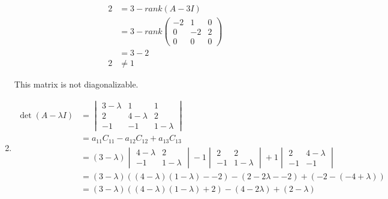\documentclass[13pt]{article}
\begin{document}
\begin{enumerate}[label=(\alph*),leftmargin=*]
\begin{enumerate}
\begin{align*}
      2 &= 3 - rank(A - 3I) \\
                   &= 3 - rank
                     \begin{pmatrix}
                       -2 & 1 & 0 \\
                       0 & -2 & 2 \\
                       0 & 0 & 0
                     \end{pmatrix} \\
                   &= 3 - 2 \\
      2 &\neq 1
    \end{align*}      
  \end{enumerate}
  This matrix is not diagonalizable.

\item
  \begin{align*}
    \det(A - \lambda I) &=
                          \begin{vmatrix}
                            3 - \lambda & 1 & 1 \\
                            2 & 4 - \lambda & 2 \\
                            -1 & -1 & 1 - \lambda        
                          \end{vmatrix} \\
                        &= a_{11}C_{11} - a_{12}C_{12} + a_{13}C_{13} \\
                        &= (3 - \lambda)
                          \begin{vmatrix}
                            4 - \lambda & 2 \\
                            -1 & 1 - \lambda
                          \end{vmatrix} - 1
                          \begin{vmatrix}
                            2 & 2 \\
                            -1 & 1 - \lambda
                          \end{vmatrix} + 1
                          \begin{vmatrix}
                            2 & 4 - \lambda \\
                            -1 & -1
                          \end{vmatrix} \\
                        &= (3 - \lambda)((4 - \lambda)(1 - \lambda) - -2) - (2 - 2\lambda - -2) + (-2 - (-4 + \lambda)) \\
                        &= (3 - \lambda)((4 - \lambda)(1 - \lambda) + 2) - (4 - 2\lambda) + (2 - \lambda) \\

\end{align*}
\end{enumerate}
\end{document}

